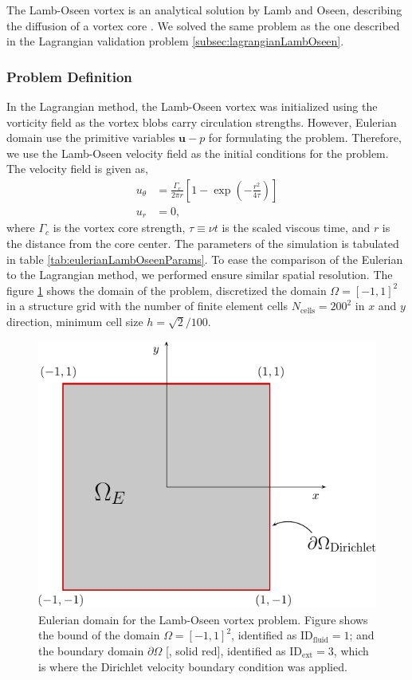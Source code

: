 The Lamb-Oseen vortex is an analytical solution by Lamb and Oseen, describing the diffusion of a vortex core \cite{Tryggeson2007}. We solved the same problem as the one described in the Lagrangian validation problem \ref{subsec:lagrangianLambOseen}. 

\subsubsection*{Problem Definition}

In the Lagrangian method, the Lamb-Oseen vortex was initialized using the vorticity field as the vortex blobs carry circulation strengths. However, Eulerian domain use the primitive variables $\mathbf{u}-p$ for formulating the problem. Therefore, we use the Lamb-Oseen velocity field as the initial conditions for the problem. The velocity field is given as,
	\begin{subequations}
	\begin{align}
	u_{\theta} &= \frac{\Gamma_c}{2\pi r} \left[1-\exp\left(-\frac{r^2}{4\tau}\right)\right]\\
	u_r &= 0,
	\end{align}
	\label{eq:eLO_veq}
	\end{subequations}
where $\Gamma_c$ is the vortex core strength, $\tau \equiv \nu t$ is the scaled viscous time, and $r$ is the distance from the core center. The parameters of the simulation is tabulated in table \ref{tab:eulerianLambOseenParams}. To ease the comparison of the Eulerian to the Lagrangian method, we performed ensure similar spatial resolution. The figure \ref{fig:lambOseenDomainDefinition} shows the domain of the problem, discretized the domain $\Omega = \left[-1,1\right]^2$ in a structure grid with the number of finite element cells $N_{\mathrm{cells}}=200^2$ in $x$ and $y$ direction, minimum cell size $h=\sqrt{2}/100$. 

	\begin{figure}[t]
	\centering
	\includegraphics[width=0.5\linewidth]{./figures/eulerian/lambOseenDomainDefinition-crop.pdf}
	\caption{Eulerian domain for the Lamb-Oseen vortex problem. Figure shows the bound of the domain $\Omega = \left[-1,1\right]^2$, identified as $\mathrm{ID}_{\mathrm{fluid}} = 1$; and the boundary domain $\partial \Omega$ [{\color{plotRed}{---}}, solid red], identified as  $\mathrm{ID}_{\mathrm{ext}} = 3$, which is where the Dirichlet velocity boundary condition was applied.}
	\label{fig:lambOseenDomainDefinition}
	\end{figure}

